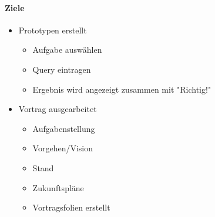 \paragraph{Ziele}
\begin{itemize}
  \item Prototypen erstellt
  \begin{itemize}
    \item Aufgabe auswählen
    \item Query eintragen
    \item Ergebnis wird angezeigt zusammen mit "Richtig!"
  \end{itemize}
  \item Vortrag ausgearbeitet
  \begin{itemize}
    \item Aufgabenstellung
    \item Vorgehen/Vision
    \item Stand
    \item Zukunftspläne
    \item Vortragsfolien erstellt
  \end{itemize}
\end{itemize}
